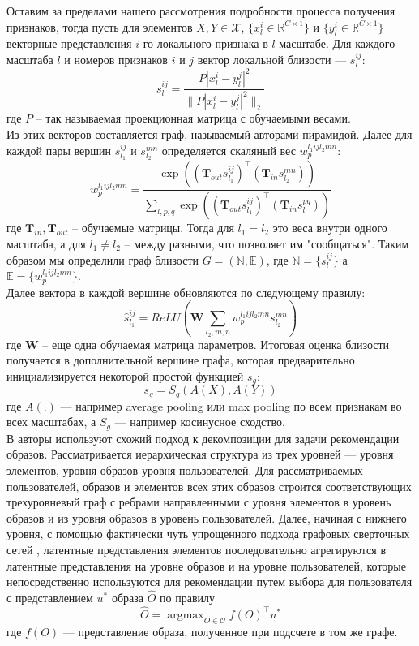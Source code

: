 \documentclass[a4paper,12pt]{article}
\DeclareMathOperator*{\argmax}{argmax}
\begin{document}
				Оставим за пределами нашего рассмотрения подробности процесса получения признаков, тогда пусть для элементов $X, Y\in \mathcal{X}$,  $\{x_l^i \in \mathbb{R}^{C\times 1}\}$ и $\{y_l^i \in \mathbb{R}^{C\times 1}\}$ векторные представления $i$-го локального признака в $l$ масштабе. Для каждого масштаба $l$ и номеров признаков $i$ и $j$ вектор локальной близости --- $s_l^{ij}$:
				$$s_l^{ij} = \frac{P|x_l^i-y_l^j|^2}{\|P|x_l^i-y_l^j|^2\|_2}$$
				где $P$ -- так называемая проекционная матрица с обучаемыми весами.\\
				Из этих векторов составляется граф, называемый авторами пирамидой. Далее для каждой пары вершин $s_{l_1}^{ij}$ и $s_{l_2}^{mn}$ определяется скаляный вес $w_p^{l_1ijl_2mn}$:
				$$w_p^{l_1ijl_2mn} = \frac{\exp((\mathbf{T}_{out}s_{l_1}^{ij})^\intercal(\mathbf{T}_{in}s_{l_2}^{mn}))}{\sum\limits_{l,p,q}\exp((\mathbf{T}_{out}s_{l_1}^{ij})^\intercal(\mathbf{T}_{in}s_{l}^{pq}))}$$ 
				где $\mathbf{T}_{in}, \mathbf{T}_{out}$ -- обучаемые матрицы.
				Тогда для $l_1=l_2$ это веса внутри одного масштаба, а для $l_1\neq l_2$ -- между разными, что позволяет им "сообщаться". Таким образом мы определили граф близости $G = (\mathbb{N},\mathbb{E})$, где $\mathbb{N} = \{s_l^{ij}\}$ а $\mathbb{E} = \{w_p^{l_1ijl_2mn}\}$.\\
				Далее вектора в каждой вершине обновляются по следующему правилу:
				$$\widehat{s}_{l_1}^{ij} =ReLU\left(\mathbf{W} \sum\limits_{l_2,m,n}w_p^{l_1ijl_2mn}s_{l_2}^{mn}\right)$$
				где $\mathbf{W}$ -- еще одна обучаемая матрица параметров. Итоговая оценка близости получается в дополнительной вершине графа, которая предварительно инициализируется некоторой простой функцией $s_g$:
				$$s_g = S_g(A(X), A(Y))$$
				где $A(.)$ --- например average pooling или max pooling по всем признакам во всех масштабах, а $S_g$ ---  например косинусное сходство.\\
				
				В \cite{https://doi.org/10.48550/arXiv.2005.12566} авторы используют схожий подход к декомпозиции для задачи рекомендации образов. Рассматривается иерархическая структура из трех уровней --- уровня элементов, уровня образов уровня пользователей. Для рассматриваемых пользователей, образов и элементов всех этих образов строится соответствующих трехуровневый граф с ребрами направленными с уровня элементов в уровень образов и из уровня образов в уровень пользователей. Далее, начиная с нижнего уровня, с помощью фактически чуть упрощенного подхода графовых сверточных сетей \cite{https://doi.org/10.48550/arXiv.1609.02907}, латентные представления элементов последовательно агрегируются в латентные представления на уровне образов и на уровне пользователей, которые непосредственно используются для рекомендации путем выбора для пользователя с представлением $u^*$ образа $\hat{O}$ по правилу $$\hat{O} = \argmax_{O\in \mathcal{O}}f(O)^\intercal u^*$$
				где $f(O)$ --- представление образа, полученное при подсчете в том же графе.
				
\end{document}
